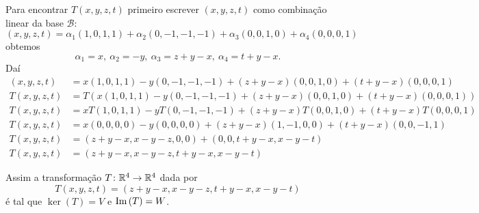 \documentclass[12pt]{exam}
\begin{document}
    Para encontrar $T(x, y, z, t)$ primeiro escrever $(x, y, z, t)$ como combina\c{c}ão linear da base $\mathcal{B}$:
    \[
        (x, y, z, t) = \alpha_1(1, 0, 1, 1) + \alpha_2(0, -1, -1, -1) + \alpha_3(0, 0, 1, 0) + \alpha_4(0, 0, 0, 1)
    \]
    obtemos
    \[
        \alpha_1 = x,\ \alpha_2 = -y,\ \alpha_3 = z + y - x,\ \alpha_4 = t + y - x.
    \]
    Daí
    \begin{align*}
        (x, y, z, t) &= x(1, 0, 1, 1) - y(0, -1, -1, -1) + (z + y - x)(0, 0, 1, 0) + (t + y - x)(0, 0, 0, 1)\\
        T(x, y, z, t) &= T(x(1, 0, 1, 1) - y(0, -1, -1, -1) + (z + y - x)(0, 0, 1, 0) + (t + y - x)(0, 0, 0, 1))\\
        T(x, y, z, t) &= xT(1, 0, 1, 1) - yT(0, -1, -1, -1) + (z + y - x)T(0, 0, 1, 0) + (t + y - x)T(0, 0, 0, 1)\\
        T(x, y, z, t) &= x(0, 0, 0, 0) - y(0, 0, 0, 0) + (z + y - x)(1, -1, 0, 0) + (t + y - x)(0, 0, -1, 1)\\
        T(x, y, z, t) &= (z + y - x, x - y - z, 0, 0) + (0, 0, t + y - x, x - y - t)\\
        T(x, y, z, t) &= (z + y - x, x - y - z, t + y - x, x - y - t)
    \end{align*}

    Assim a transforma\c{c}ão $T \colon \mathbb{R}^4 \to \mathbb{R}^4$ dada por
    \[
        T(x, y, z, t) = (z + y - x, x - y - z, t + y - x, x - y - t)
    \]
    é tal que $\ker(T) = V$ e ${\rm Im\,}(T) = W$.
\end{document}
